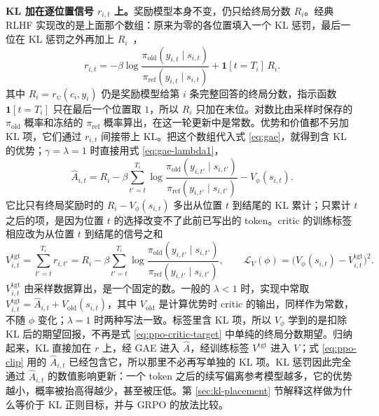 \textbf{KL 加在逐位置信号 \(r_{i,t}\) 上。}奖励模型本身不变，仍只给终局分数 \(R_i\)。经典 RLHF 实现改的是上面那个数组：原来为零的各位置填入一个 KL 惩罚，最后一位在 KL 惩罚之外再加上 \(R_i\)~\cite{ouyang2022instructgpt}，
\begin{equation}
 r_{i,t}=-\beta\log\frac{\pi_{\mathrm{old}}(y_{i,t}\mid s_{i,t})}{\pi_{\mathrm{ref}}(y_{i,t}\mid s_{i,t})}+\mathbf 1[t=T_i]\,R_i .
 \label{eq:ppo-kl-reward}
\end{equation}
其中 \(R_i=r_\psi(c_i,y_i)\) 仍是奖励模型给第 \(i\) 条完整回答的终局分数，指示函数 \(\mathbf 1[t=T_i]\) 只在最后一个位置取 \(1\)，所以 \(R_i\) 只加在末位。对数比由采样时保存的 \(\pi_{\mathrm{old}}\) 概率和冻结的 \(\pi_{\mathrm{ref}}\) 概率算出，在这一轮更新中是常数。优势和价值都不另加 KL 项，它们通过 \(r_{i,t}\) 间接带上 KL。把这个数组代入式 \eqref{eq:gae}，就得到含 KL 的优势；\(\gamma=\lambda=1\) 时直接用式 \eqref{eq:gae-lambda1}，
\begin{equation}
 \widehat A_{i,t}
 =R_i-\beta\sum_{t'=t}^{T_i}\log\frac{\pi_{\mathrm{old}}(y_{i,t'}\mid s_{i,t'})}{\pi_{\mathrm{ref}}(y_{i,t'}\mid s_{i,t'})}-V_\phi(s_{i,t}).
 \label{eq:ppo-kl-advantage}
\end{equation}
它比只有终局奖励时的 \(R_i-V_\phi(s_{i,t})\) 多出从位置 \(t\) 到结尾的 KL 累计；只累计 \(t\) 之后的项，是因为位置 \(t\) 的选择改变不了此前已写出的 token。critic 的训练标签相应改为从位置 \(t\) 到结尾的信号之和
\begin{equation}
 V^{\mathrm{tgt}}_{i,t}=\sum_{t'=t}^{T_i}r_{i,t'}=R_i-\beta\sum_{t'=t}^{T_i}\log\frac{\pi_{\mathrm{old}}(y_{i,t'}\mid s_{i,t'})}{\pi_{\mathrm{ref}}(y_{i,t'}\mid s_{i,t'})},
 \qquad
 \mathcal L_V(\phi)=\bigl(V_\phi(s_{i,t})-V^{\mathrm{tgt}}_{i,t}\bigr)^2 .
\end{equation}
\(V^{\mathrm{tgt}}_{i,t}\) 由采样数据算出，是一个固定的数。一般的 \(\lambda<1\) 时，实现中常取 \(V^{\mathrm{tgt}}_{i,t}=\widehat A_{i,t}+V_{\mathrm{old}}(s_{i,t})\)，其中 \(V_{\mathrm{old}}\) 是计算优势时 critic 的输出，同样作为常数，不随 \(\phi\) 变化；\(\lambda=1\) 时两种写法一致。标签里含 KL 项，所以 \(V_\phi\) 学到的是扣除 KL 后的期望回报，不再是式 \eqref{eq:ppo-critic-target} 中单纯的终局分数期望。归纳起来，KL 直接加在 \(r\) 上，经 GAE 进入 \(\widehat A\)，经训练标签 \(V^{\mathrm{tgt}}\) 进入 \(V\)；式 \eqref{eq:ppo-clip} 用的 \(\widehat A_{i,t}\) 已经包含它，所以那里不必再写单独的 KL 项。KL 惩罚因此完全通过 \(\widehat A_{i,t}\) 的数值影响更新：一个 token 之后的续写偏离参考模型越多，它的优势越小，概率被抬高得越少，甚至被压低。第 \ref{sec:kl-placement} 节解释这样做为什么等价于 KL 正则目标，并与 GRPO 的放法比较。

